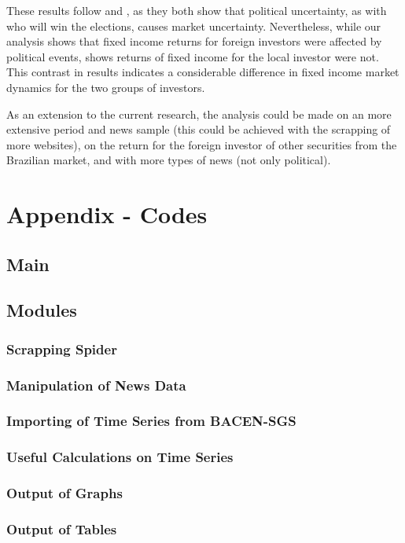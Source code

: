 \documentclass[cic,tc, english]{iiufrgs}
\begin{document}
    These results follow \citet{smales2015} and \citet{marquessantos2016}, as they both show that political uncertainty, as with who will win the elections, causes market uncertainty. Nevertheless, while our analysis shows that fixed income returns for foreign investors were affected by political events, \citet{marquessantos2016} shows returns of fixed income for the local investor were not. This contrast in results indicates a considerable difference in fixed income market dynamics for the two groups of investors.

    As an extension to the current research, the analysis could be made on an more extensive period and news sample (this could be achieved with the scrapping of more websites), on the return for the foreign investor of other securities from the Brazilian market, and with more types of news (not only political).
    
\chapter{Appendix - Codes} \label{chapter_appendix}

\section{Main}

    

\section{Modules}

\subsection{Scrapping Spider}

    
    
\subsection{Manipulation of News Data}

    

\subsection{Importing of Time Series from BACEN-SGS}

    

\subsection{Useful Calculations on Time Series}

    

\subsection{Output of Graphs}

    

\subsection{Output of Tables}

    


 \label{chapter_bibliography}
\end{document}
